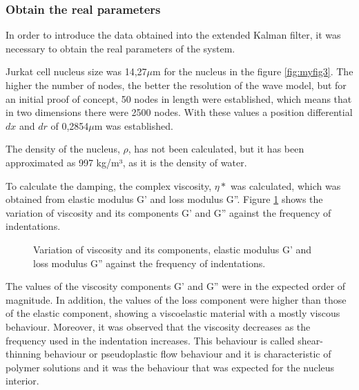\documentclass[12pt, a4paper]{article} %
\begin{document}
	\setlength{\parskip}{0mm}
	
	\subsubsection{Obtain the real parameters}
	
	In order to introduce the data obtained into the extended Kalman filter, it was necessary to obtain the real parameters of the system. 
	
	\setlength{\parskip}{4mm}
	
	Jurkat cell nucleus size was 14,27$\mu$m for the nucleus in the figure \ref{fig:myfig3}. The higher the number of nodes, the better the resolution of the wave model, but for an initial proof of concept, 50 nodes in length were established, which means that in two dimensions there were 2500 nodes. With these values a position differential $dx$ and $dr$ of 0,2854$\mu$m was established.
	
	The density of the nucleus, $\rho$, has not been calculated, but it has been approximated as 997 kg/m³, as it is the density of water.
	
	\newpage
	
	To calculate the damping, the complex viscosity, $\eta *$ was calculated, which was obtained from elastic modulus G' and loss modulus G''. Figure \ref{fig:vicosidad} shows the variation of viscosity and its components G' and G'' against the frequency of indentations. \setlength{\parskip}{0mm}
	\begin{figure}[H]
		\centering
		
		\caption{Variation of viscosity and its components, elastic modulus G' and loss modulus G'' against the frequency of indentations.}
		\label{fig:vicosidad}
	\end{figure}
	The values of the viscosity components G' and G'' were in the expected order of magnitude. In addition, the values of the loss component were higher than those of the elastic component, showing a viscoelastic material with a mostly viscous behaviour. Moreover, it was observed that the viscosity decreases as the frequency used in the indentation increases. This behaviour is called shear-thinning behaviour or pseudoplastic flow behaviour and it is characteristic of polymer solutions \cite{mezger2020rheology} and it was the behaviour that was expected for the nucleus interior. 
	
\end{document}
